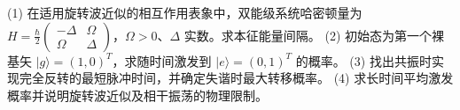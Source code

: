 (1) 在适用旋转波近似的相互作用表象中，双能级系统哈密顿量为 \(H=\frac{\hbar}{2}\begin{pmatrix}-\Delta&\Omega\\\Omega&\Delta\end{pmatrix}\)，\(\Omega>0\)、\(\Delta\) 实数。求本征能量间隔。
(2) 初始态为第一个裸基矢 \(|g\rangle=(1,0)^T\)，求随时间激发到 \(|e\rangle=(0,1)^T\) 的概率。
(3) 找出共振时实现完全反转的最短脉冲时间，并确定失谐时最大转移概率。
(4) 求长时间平均激发概率并说明旋转波近似及相干振荡的物理限制。
